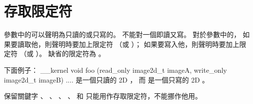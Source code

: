 \section{存取限定符}

參數中的可以聲明為只讀的或只寫的。
不能對一個即讀又寫。
對於參數中的，
如果要讀取他，則聲明時要加上限定符  （或 ）；
如果要寫入他，則聲明時要加上限定符  （或 ）。
缺省的限定符為 。

下面例子：
\startclc
__kernel void foo (read_only image2d_t imageA,
		   write_only image2d_t imageB)
{
	....
}
\stopclc
{} 是一個只讀的 2D ，
而  是一個只寫的 2D 。

保留關鍵字
 、 、 、
 、  和 
 只能用作存取限定符，不能挪作他用。



